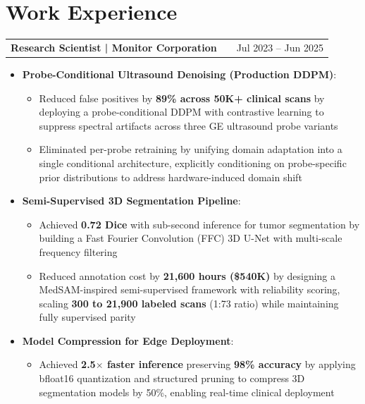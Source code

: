 \documentclass[a4paper,10pt]{article}
\makeatletter
\newenvironment{joblong}[2]
    {
    \begin{tabularx}{\linewidth}{@{}l X r@{}}
    \textbf{#1} & \hfill &  #2 \\[3.75pt]
    \end{tabularx}
    \begin{minipage}[t]{\linewidth}
    \begin{itemize}[nosep,after=\strut, leftmargin=1em, itemsep=3pt,label=--]
    }
    {
    \end{itemize}
    \end{minipage}    
    }
\makeatother
\begin{document}
\section{Work Experience}

\begin{joblong}{Research Scientist | Monitor Corporation}{Jul 2023 -- Jun 2025}
\item \textbf{Probe-Conditional Ultrasound Denoising (Production DDPM)}:
\begin{itemize}[nosep,after=\strut, leftmargin=2em, itemsep=1pt,label=$\circ$]
\item Reduced false positives by \textbf{89\% across 50K+ clinical scans} by deploying a probe-conditional DDPM with contrastive learning to suppress spectral artifacts across three GE ultrasound probe variants
\item Eliminated per-probe retraining by unifying domain adaptation into a single conditional architecture, explicitly conditioning on probe-specific prior distributions to address hardware-induced domain shift
\end{itemize}
\item \textbf{Semi-Supervised 3D Segmentation Pipeline}:
\begin{itemize}[nosep,after=\strut, leftmargin=2em, itemsep=1pt,label=$\circ$]
\item Achieved \textbf{0.72 Dice} with sub-second inference for tumor segmentation by building a Fast Fourier Convolution (FFC) 3D U-Net with multi-scale frequency filtering
\item Reduced annotation cost by \textbf{21,600 hours (\$540K)} by designing a MedSAM-inspired semi-supervised framework with reliability scoring, scaling \textbf{300 to 21,900 labeled scans} (1:73 ratio) while maintaining fully supervised parity
\end{itemize}
\item \textbf{Model Compression for Edge Deployment}:
\begin{itemize}[nosep,after=\strut, leftmargin=2em, itemsep=1pt,label=$\circ$]
\item Achieved \textbf{2.5$\times$ faster inference} preserving \textbf{98\% accuracy} by applying bfloat16 quantization and structured pruning to compress 3D segmentation models by 50\%, enabling real-time clinical deployment
\end{itemize}
\end{joblong}
\end{document}
